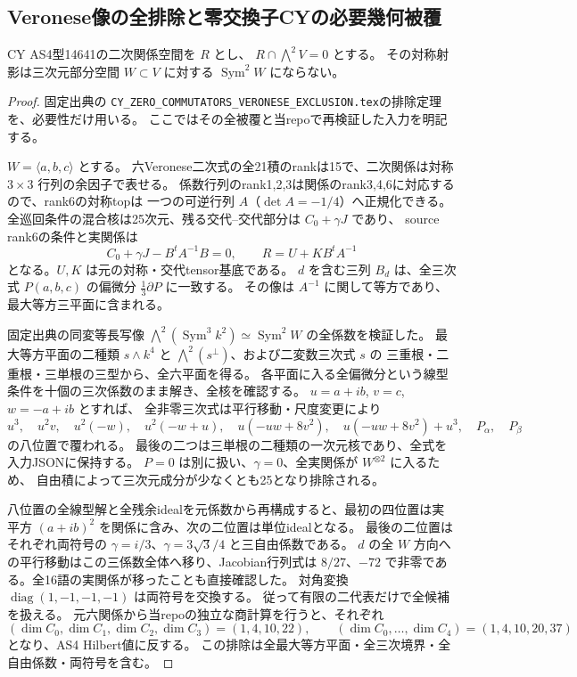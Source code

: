 \subsection{Veronese像の全排除と零交換子CYの必要幾何被覆}
\label{subsec:cubic-CY-Veronese}
\begin{proposition}\label{prop:cubic-CY-Veronese-excluded}
CY AS4型14641の二次関係空間を $R$ とし、
$R\cap\bigwedge^2V=0$ とする。
その対称射影は三次元部分空間 $W\subset V$ に対する $\operatorname{Sym}^2W$ にならない。
\end{proposition}
\begin{proof}
固定出典\cite{AS4CYpinned}の
\texttt{CY\_ZERO\_COMMUTATORS\_VERONESE\_EXCLUSION.tex}の排除定理を、必要性だけ用いる。
ここではその全被覆と当repoで再検証した入力を明記する。

$W=\langle a,b,c\rangle$ とする。
六Veronese二次式の全21積のrankは15で、二次関係は対称 $3\times3$ 行列の余因子で表せる。
係数行列のrank1,2,3は関係のrank3,4,6に対応するので、rank6の対称topは
一つの可逆行列 $A$（$\det A=-1/4$）へ正規化できる。
全巡回条件の混合核は25次元、残る交代--交代部分は $C_0+\gamma J$ であり、
source rank6の条件と実関係は
\[
 C_0+\gamma J-B^tA^{-1}B=0,\qquad R=U+KB^tA^{-1}
\]
となる。$U,K$ は元の対称・交代tensor基底である。
$d$ を含む三列 $B_d$ は、全三次式 $P(a,b,c)$ の偏微分 $\tfrac13\partial P$ に一致する。
その像は $A^{-1}$ に関して等方であり、最大等方三平面に含まれる。

固定出典の同変等長写像
$\bigwedge^2(\operatorname{Sym}^3k^2)\simeq\operatorname{Sym}^2W$
の全係数を検証した。
最大等方平面の二種類 $s\wedge k^4$ と $\bigwedge^2(s^\perp)$、および二変数三次式 $s$ の
三重根・二重根・三単根の三型から、全六平面を得る。
各平面に入る全偏微分という線型条件を十個の三次係数のまま解き、全核を確認する。
$u=a+ib$, $v=c$, $w=-a+ib$ とすれば、
全非零三次式は平行移動・尺度変更により
\[
 u^3,\quad u^2v,\quad u^2(-w),\quad u^2(-w+u),\quad
 u(-uw+8v^2),\quad u(-uw+8v^2)+u^3,\quad P_\alpha,\quad P_\beta
\]
の八位置で覆われる。
最後の二つは三単根の二種類の一次元核であり、全式を入力JSONに保持する。
$P=0$ は別に扱い、$\gamma=0$、全実関係が $W^{\otimes2}$ に入るため、
自由積によって三次元成分が少なくとも25となり排除される。

八位置の全線型解と全残余idealを元係数から再構成すると、最初の四位置は実平方
$(a+ib)^2$ を関係に含み、次の二位置は単位idealとなる。
最後の二位置はそれぞれ両符号の $\gamma=i/3$、$\gamma=3\sqrt3/4$ と三自由係数である。
$d$ の全 $W$ 方向への平行移動はこの三係数全体へ移り、Jacobian行列式は
$8/27$、$-72$ で非零である。全16語の実関係が移ったことも直接確認した。
対角変換 $\operatorname{diag}(1,-1,-1,-1)$ は両符号を交換する。
従って有限の二代表だけで全候補を扱える。
元六関係から当repoの独立な商計算を行うと、それぞれ
\[
 (\dim C_0,\dim C_1,\dim C_2,\dim C_3)=(1,4,10,22),\qquad
 (\dim C_0,\ldots,\dim C_4)=(1,4,10,20,37)
\]
となり、AS4 Hilbert値に反する。
この排除は全最大等方平面・全三次境界・全自由係数・両符号を含む。
\end{proof}

